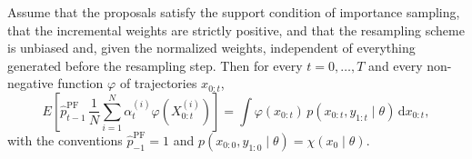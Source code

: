 \begin{lemma}
    \label{lem:pf_unnormalized_unbiased}
    Assume that the proposals satisfy the support condition of importance sampling, that the incremental weights are strictly positive, and that the resampling scheme is unbiased and, given the normalized weights, independent of everything generated before the resampling step. Then for every $t=0,\ldots,T$ and every non-negative function $\varphi$ of trajectories $x_{0:t}$,
    \begin{equation}
        E\left[\hat{p}^{\mathrm{PF}}_{t-1} \, \frac{1}{N}\sum_{i=1}^{N} \alpha_t^{(i)}\varphi(X_{0:t}^{(i)})\right] = \int \varphi(x_{0:t})\,p(x_{0:t},y_{1:t}\mid\theta)\,\mathrm{d}x_{0:t},
        \label{eq:pf_unnormalized_unbiased}
    \end{equation}
    with the conventions $\hat{p}^{\mathrm{PF}}_{-1} = 1$ and $p(x_{0:0},y_{1:0}\mid\theta) = \chi(x_0\mid\theta)$.
\end{lemma}
